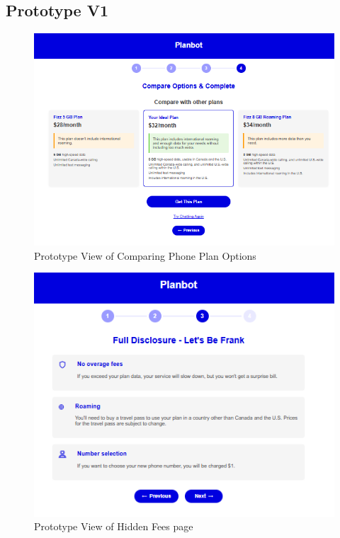 \documentclass[conference]{IEEEtran}
\begin{document}
\subsection{Prototype V1}
\begin{figure}[H]
    \centering
    \includegraphics[width=1\linewidth]{Prototype V1/compare options.png}
    \caption{Prototype View of Comparing Phone Plan Options}
    \label{fig:user flow}
\end{figure}
\begin{figure}[H]
    \centering
    \includegraphics[width=1\linewidth]{Prototype V1/Hidden Fees.png}
    \caption{Prototype View of Hidden Fees page}
    \label{fig:user flow}
\end{figure}
\end{document}

